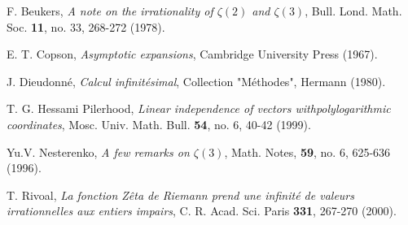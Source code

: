 \documentclass[12pt]{article}
\begin{document}
\noindent [Be] F. Beukers, \textit{A note on the irrationality of
$\zeta(2)$ and $\zeta(3)$},  Bull. Lond. Math. Soc.
\textbf{11}, no. 33, 268-272 (1978).\\ \null

\noindent [Co] E. T. Copson, \textit{Asymptotic expansions},
Cambridge University Press (1967).\\ \null

\noindent [Di] J. Dieudonn\'e, \textit{Calcul infinit\'esimal},
Collection "M\'ethodes", Hermann (1980).\\ \null

\noindent [HP] T. G. Hessami Pilerhood, \textit{Linear independence of vectors
with\break polylogarithmic coordinates}, Mosc. Univ. Math. Bull. \textbf{54},
no. 6, 40-42 (1999).\\ \null

\noindent [Ne] Yu.V. Nesterenko, \textit{A few remarks on $\zeta(3)$},
Math. Notes, \textbf{59}, no. 6,  625-636 (1996).\\ \null

\noindent [R] T. Rivoal, \textit{La fonction Z\^eta de Riemann prend une
infinit\' e de valeurs irrationnelles aux entiers impairs}, C. R. Acad. Sci.
Paris \textbf{331}, 267-270 (2000).\\ \null
\end{document}
